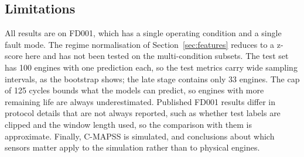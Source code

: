 \subsection{Limitations}
All results are on FD001, which has a single operating condition and a
single fault mode. The regime normalisation of Section~\ref{sec:features}
reduces to a z-score here and has not been tested on the multi-condition
subsets. The test set has 100 engines with one prediction each, so the
test metrics carry wide sampling intervals, as the bootstrap shows; the
late stage contains only 33 engines. The cap of 125 cycles bounds what the
models can predict, so engines with more remaining life are always
underestimated. Published FD001 results differ in protocol details that
are not always reported, such as whether test labels are clipped and the
window length used, so the comparison with them is approximate. Finally,
C-MAPSS is simulated, and conclusions about which sensors matter apply to
the simulation rather than to physical engines.
